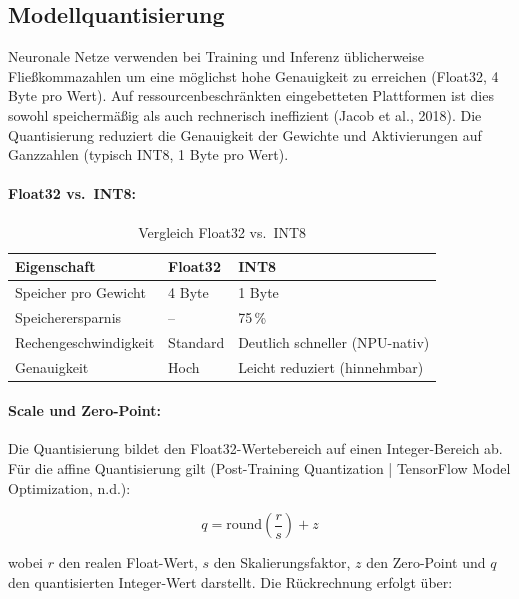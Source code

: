 \subsection{Modellquantisierung}

Neuronale Netze verwenden bei Training und Inferenz üblicherweise Fließkommazahlen um eine möglichst hohe Genauigkeit zu erreichen (Float32, 4 Byte pro Wert). Auf ressourcenbeschränkten eingebetteten Plattformen ist dies sowohl speichermäßig als auch rechnerisch ineffizient (Jacob et al., 2018). Die Quantisierung reduziert die Genauigkeit der Gewichte und Aktivierungen auf Ganzzahlen (typisch INT8, 1 Byte pro Wert).

\paragraph{Float32 vs.\ INT8:}

\begin{table}[htbp]
    \centering
    \caption{Vergleich Float32 vs.\ INT8}
    \label{tab:float32-vs-int8}
    \begin{tabular}{|p{}|l|l|}
        \hline
        \textbf{Eigenschaft} & \textbf{Float32} & \textbf{INT8} \\
        \hline
        Speicher pro Gewicht & 4 Byte & 1 Byte \\
        \hline
        Speicherersparnis & -- & 75\,\% \\
        \hline
        Rechengeschwindigkeit & Standard & Deutlich schneller (NPU-nativ) \\
        \hline
        Genauigkeit & Hoch & Leicht reduziert (hinnehmbar) \\
        \hline
    \end{tabular}
\end{table}

\paragraph{Scale und Zero-Point:}
Die Quantisierung bildet den Float32-Wertebereich auf einen Integer-Bereich ab. Für die affine Quantisierung gilt (Post-Training Quantization | TensorFlow Model Optimization, n.d.):

$$q = \text{round}\left(\frac{r}{s}\right) + z$$

wobei $r$ den realen Float-Wert, $s$ den Skalierungsfaktor, $z$ den Zero-Point und $q$ den quantisierten Integer-Wert darstellt. Die Rückrechnung erfolgt über:

